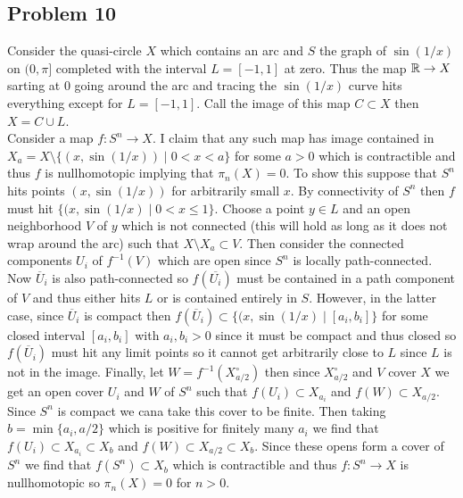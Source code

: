 \documentclass[12pt]{extarticle}
\begin{document}
\subsection{Problem 10}


Consider the quasi-circle $X$ which contains an arc and $S$ the graph of $\sin{(1/x)}$ on $(0, \pi]$ completed with the interval $L = [-1, 1]$ at zero. Thus the map $\mathbb{R} \to X$ sarting at $0$ going around the arc and tracing the $\sin{(1/x)}$ curve hits everything except for $L = [-1,1]$. Call the image of this map $C \subset X$ then $X = C \cup L$. 
\bigskip\\
Consider a map $f : S^n \to X$. I claim that any such map has image contained in $X_a = X \setminus \{ (x, \sin{(1/x)}) \mid 0 < x < a \}$ for some $a > 0$ which is contractible and thus $f$ is nullhomotopic implying that $\pi_n(X) = 0$. To show this suppose that $S^n$ hits  points $(x, \sin{(1/x)})$ for arbitrarily small $x$. By connectivity of $S^n$ then $f$ must hit $\{ (x, \sin{(1 / x)} \mid 0 < x \le 1 \}$. Choose a point $y \in L$ and an open neighborhood $V$ of $y$ which is not connected (this will hold as long as it does not wrap around the arc) such that $X \setminus X_a \subset V$. Then consider the connected components $U_i$ of $f^{-1}(V)$ which are open since $S^n$ is locally path-connected. Now $\overline{U}_i$ is also path-connected so $f(\overline{U_i})$ must be contained in a path component of $V$ and thus either hits $L$ or is contained entirely in $S$. However, in the latter case, since $\overline{U}_i$ is compact then $f(\overline{U}_i) \subset \{ (x, \sin{(1/ x)} \mid [a_i, b_i] \}$ for some closed interval $[a_i, b_i]$ with $a_i, b_i > 0$ since it must be compact and thus closed so $f(\overline{U}_i)$ must hit any limit points so it cannot get arbitrarily close to $L$ since $L$ is not in the image. Finally, let $W = f^{-1}(X_{a/2}^\circ)$ then since $X_{a/2}^\circ$ and $V$ cover $X$ we get an open cover $U_i$ and $W$ of $S^n$ such that $f(U_i) \subset X_{a_i}$ and $f(W) \subset X_{a/2}$. Since $S^n$ is compact we cana take this cover to be finite. Then taking $b = \min \{ a_i, a/2 \}$ which is positive for finitely many $a_i$ we find that $f(U_i) \subset X_{a_i} \subset X_{b}$ and $f(W) \subset X_{a/2} \subset X_b$. Since these opens form a cover of $S^n$ we find that $f(S^n) \subset X_b$ which is contractible and thus $f : S^n \to X$ is nullhomotopic so $\pi_n(X) = 0$ for $n > 0$. 
\bigskip\\
\end{document}
